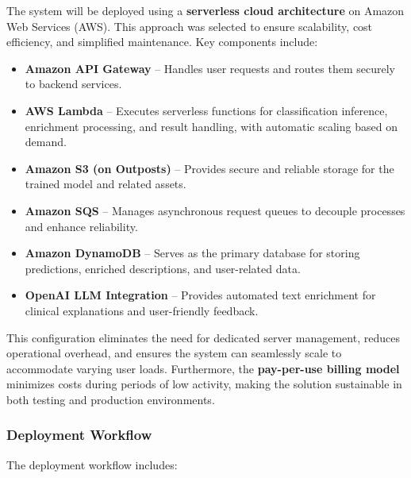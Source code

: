 \documentclass[
  12pt,
  oneside]{article}
\providecommand{\tightlist}{%
  \setlength{\itemsep}{0pt}\setlength{\parskip}{0pt}}
\begin{document}
The system will be deployed using a \textbf{serverless cloud
architecture} on Amazon Web Services (AWS). This approach was selected
to ensure scalability, cost efficiency, and simplified maintenance. Key
components include:

\begin{itemize}
\tightlist
\item
  \textbf{Amazon API Gateway} -- Handles user requests and routes them
  securely to backend services.\\
\item
  \textbf{AWS Lambda} -- Executes serverless functions for
  classification inference, enrichment processing, and result handling,
  with automatic scaling based on demand.\\
\item
  \textbf{Amazon S3 (on Outposts)} -- Provides secure and reliable
  storage for the trained model and related assets.\\
\item
  \textbf{Amazon SQS} -- Manages asynchronous request queues to decouple
  processes and enhance reliability.\\
\item
  \textbf{Amazon DynamoDB} -- Serves as the primary database for storing
  predictions, enriched descriptions, and user-related data.\\
\item
  \textbf{OpenAI LLM Integration} -- Provides automated text enrichment
  for clinical explanations and user-friendly feedback.
\end{itemize}

This configuration eliminates the need for dedicated server management,
reduces operational overhead, and ensures the system can seamlessly
scale to accommodate varying user loads. Furthermore, the
\textbf{pay-per-use billing model} minimizes costs during periods of low
activity, making the solution sustainable in both testing and production
environments.

\subsubsection{Deployment Workflow}\label{deployment-workflow}

The deployment workflow includes:
\end{document}
